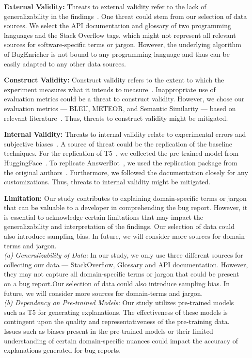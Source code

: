 \textbf{External Validity:}
Threats to external validity refer to the lack of generalizability in the findings~\cite{ferguson2004external}. One threat could stem from our selection of data sources. We select the API documentation and glossary of two programming languages and the Stack Overflow tags, which might not represent all relevant sources for software-specific terms or jargon. However, the underlying algorithm of BugEnricher is not bound to any programming language and thus can be easily adapted to any other data sources.\par 

\textbf{Construct Validity:} Construct validity refers to the extent to which the experiment measures what it intends to measure~\cite{smith2005construct}. 
Inappropriate use of evaluation metrics could be a threat to construct validity. However, we chose our evaluation metrics --- BLEU, METEOR, and Semantic Similarity --- based on relevant literature~\cite{papineni2002bleu,banerjee2005meteor,haque2022semantic,huang2016supervised}. Thus, threats to construct validity might be mitigated.\par

\textbf{Internal Validity:}
Threats to internal validity relate to experimental errors and subjective biases~\cite{christ2007experimental}. A source of threat could be the replication of the baseline techniques. For the replication of T5~\cite{raffel2020exploring}, we collected the pre-trained model from HuggingFace~\cite{huggingface_t5}. To replicate AnswerBot~\cite{xu2017answerbot}, we used the replication package from the original authors~\cite{maxxbw54}. Furthermore, we followed the documentation closely for any customizations. Thus, threats to internal validity might be mitigated.

\textbf{Limitation:} Our study contributes to explaining domain-specific terms or jargon that can be valuable to a developer in comprehending the bug report. However, it is essential to acknowledge certain limitations that may impact the generalizability and interpretation of the findings. Our selection of data could also introduce sampling bias. In future, we will consider more sources for domain-terms and jargon.\\
\textit{(a) Generalizability of Data:} In our study, we only use three different sources for collecting our data --- StackOverflow, Glossary and API documentation. However, they may not capture all domain-specific terms or jargon that could be present on a bug report.Our selection of data could also introduce sampling bias. In future, we will consider more sources for domain-terms and jargon.\\
\textit{(b) Dependency on Pre-trained Models:}
Our study utilizes pre-trained models such as T5 for generating explanations. The effectiveness of these models is contingent upon the quality and representativeness of the pre-training data. Issues such as biases present in the pre-trained models or their limited understanding of certain domain-specific nuances could impact the accuracy of explanations generated for bug reports.
